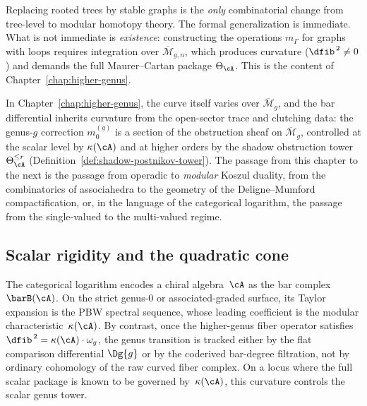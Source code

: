 \begin{remark}
\label{rem:trees-to-graphs}
Replacing rooted trees by stable graphs is the
\emph{only} combinatorial change from tree-level to modular homotopy
theory. The formal generalization is immediate. What is not
immediate is \emph{existence}: constructing the operations $m_\Gamma$
for graphs with loops requires integration over
$\overline{\mathcal{M}}_{g,n}$, which produces curvature
($\dfib^{\,2} \neq 0$) and demands the full Maurer--Cartan package
$\Theta_\cA$. This is the content of
Chapter~\ref{chap:higher-genus}.
\end{remark}

\medskip

In Chapter~\ref{chap:higher-genus}, the curve itself varies over
$\overline{\mathcal{M}}_g$, and the bar differential inherits
curvature from the open-sector trace and clutching data: the
genus-$g$ correction $m_0^{(g)}$ is a section of the obstruction
sheaf on $\overline{\mathcal{M}}_g$, controlled at the scalar
level by $\kappa(\cA)$ and at higher orders by the shadow
obstruction tower $\Theta_{\cA}^{\leq r}$
(Definition~\ref{def:shadow-postnikov-tower}). The passage
from this chapter to the next is the passage from operadic to
\emph{modular} Koszul duality, from the combinatorics of
associahedra to the geometry of the Deligne--Mumford
compactification, or, in the language of the categorical logarithm,
the passage from the single-valued to the multi-valued regime.

\subsection{Scalar rigidity and the quadratic cone}
\label{subsec:scalar-rigidity-quadratic-frontier}

The categorical logarithm encodes a chiral
algebra~$\cA$ as the bar complex $\barB(\cA)$. On the strict
genus-$0$ or associated-graded surface, its Taylor expansion is the PBW
spectral sequence, whose leading coefficient is the modular
characteristic~$\kappa(\cA)$. By contrast, once the higher-genus
fiber operator satisfies
$\dfib^{\,2} = \kappa(\cA) \cdot \omega_g$, the genus transition is
tracked either by the flat comparison differential $\Dg{g}$ or by the
coderived bar-degree filtration, not by ordinary cohomology of the
raw curved fiber complex. On a locus where the full scalar package is
known to be governed by~$\kappa(\cA)$, this curvature controls the
scalar genus tower.

